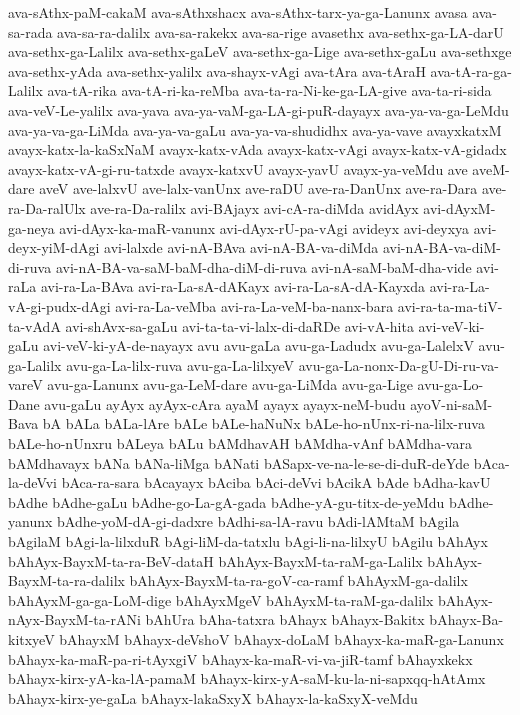 {ava-sAthx-paM-cakaM
ava-sAthxshacx
ava-sAthx-tarx-ya-ga-Lanunx
avasa
ava-sa-rada
ava-sa-ra-dalilx
ava-sa-rakekx
ava-sa-rige
avasethx
ava-sethx-ga-LA-darU
ava-sethx-ga-Lalilx
ava-sethx-gaLeV
ava-sethx-ga-Lige
ava-sethx-gaLu
ava-sethxge
ava-sethx-yAda
ava-sethx-yalilx
ava-shayx-vAgi
ava-tAra
ava-tAraH
ava-tA-ra-ga-Lalilx
ava-tA-rika
ava-tA-ri-ka-reMba
ava-ta-ra-Ni-ke-ga-LA-give
ava-ta-ri-sida
ava-veV-Le-yalilx
ava-yava
ava-ya-vaM-ga-LA-gi-puR-dayayx
ava-ya-va-ga-LeMdu
ava-ya-va-ga-LiMda
ava-ya-va-gaLu
ava-ya-va-shudidhx
ava-ya-vave
avayxkatxM
avayx-katx-la-kaSxNaM
avayx-katx-vAda
avayx-katx-vAgi
avayx-katx-vA-gidadx
avayx-katx-vA-gi-ru-tatxde
avayx-katxvU
avayx-yavU
avayx-ya-veMdu
ave
aveM-dare
aveV
ave-lalxvU
ave-lalx-vanUnx
ave-raDU
ave-ra-DanUnx
ave-ra-Dara
ave-ra-Da-ralUlx
ave-ra-Da-ralilx
avi-BAjayx
avi-cA-ra-diMda
avidAyx
avi-dAyxM-ga-neya
avi-dAyx-ka-maR-vanunx
avi-dAyx-rU-pa-vAgi
avideyx
avi-deyxya
avi-deyx-yiM-dAgi
avi-lalxde
avi-nA-BAva
avi-nA-BA-va-diMda
avi-nA-BA-va-diM-di-ruva
avi-nA-BA-va-saM-baM-dha-diM-di-ruva
avi-nA-saM-baM-dha-vide
avi-raLa
avi-ra-La-BAva
avi-ra-La-sA-dAKayx
avi-ra-La-sA-dA-Kayxda
avi-ra-La-vA-gi-pudx-dAgi
avi-ra-La-veMba
avi-ra-La-veM-ba-nanx-bara
avi-ra-ta-ma-tiV-ta-vAdA
avi-shAvx-sa-gaLu
avi-ta-ta-vi-lalx-di-daRDe
avi-vA-hita
avi-veV-ki-gaLu
avi-veV-ki-yA-de-nayayx
avu
avu-gaLa
avu-ga-Ladudx
avu-ga-LalelxV
avu-ga-Lalilx
avu-ga-La-lilx-ruva
avu-ga-La-lilxyeV
avu-ga-La-nonx-Da-gU-Di-ru-va-vareV
avu-ga-Lanunx
avu-ga-LeM-dare
avu-ga-LiMda
avu-ga-Lige
avu-ga-Lo-Dane
avu-gaLu
ayAyx
ayAyx-cAra
ayaM
ayayx
ayayx-neM-budu
ayoV-ni-saM-Bava
bA
bALa
bALa-lAre
bALe
bALe-haNuNx
bALe-ho-nUnx-ri-na-lilx-ruva
bALe-ho-nUnxru
bALeya
bALu
bAMdhavAH
bAMdha-vAnf
bAMdha-vara
bAMdhavayx
bANa
bANa-liMga
bANati
bASapx-ve-na-le-se-di-duR-deYde
bAca-la-deVvi
bAca-ra-sara
bAcayayx
bAciba
bAci-deVvi
bAcikA
bAde
bAdha-kavU
bAdhe
bAdhe-gaLu
bAdhe-go-La-gA-gada
bAdhe-yA-gu-titx-de-yeMdu
bAdhe-yanunx
bAdhe-yoM-dA-gi-dadxre
bAdhi-sa-lA-ravu
bAdi-lAMtaM
bAgila
bAgilaM
bAgi-la-lilxduR
bAgi-liM-da-tatxlu
bAgi-li-na-lilxyU
bAgilu
bAhAyx
bAhAyx-BayxM-ta-ra-BeV-dataH
bAhAyx-BayxM-ta-raM-ga-Lalilx
bAhAyx-BayxM-ta-ra-dalilx
bAhAyx-BayxM-ta-ra-goV-ca-ramf
bAhAyxM-ga-dalilx
bAhAyxM-ga-ga-LoM-dige
bAhAyxMgeV
bAhAyxM-ta-raM-ga-dalilx
bAhAyx-nAyx-BayxM-ta-rANi
bAhUra
bAha-tatxra
bAhayx
bAhayx-Bakitx
bAhayx-Ba-kitxyeV
bAhayxM
bAhayx-deVshoV
bAhayx-doLaM
bAhayx-ka-maR-ga-Lanunx
bAhayx-ka-maR-pa-ri-tAyxgiV
bAhayx-ka-maR-vi-va-jiR-tamf
bAhayxkekx
bAhayx-kirx-yA-ka-lA-pamaM
bAhayx-kirx-yA-saM-ku-la-ni-sapxqq-hAtAmx
bAhayx-kirx-ye-gaLa
bAhayx-lakaSxyX
bAhayx-la-kaSxyX-veMdu
}
